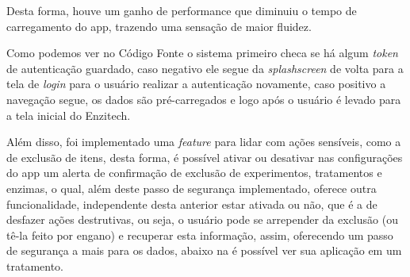 Desta forma, houve um ganho de performance que diminuiu o tempo de carregamento do \ac{app}, trazendo uma sensação de maior fluidez.

Como podemos ver no Código Fonte  o sistema primeiro checa se há algum \textit{token} de autenticação guardado, caso negativo ele segue da \textit{splashscreen} de volta para a tela de \textit{login} para o usuário realizar a autenticação novamente, caso positivo a navegação segue, os dados são pré-carregados e logo após o usuário é levado para a tela inicial do Enzitech.

Além disso, foi implementado uma \textit{feature} para lidar com ações sensíveis, como a de exclusão de itens, desta forma, é possível ativar ou desativar nas configurações do \ac{app} um alerta de confirmação de exclusão de experimentos, tratamentos e enzimas, o qual, além deste passo de segurança implementado, oferece outra funcionalidade, independente desta anterior estar ativada ou não, que é a de desfazer ações destrutivas, ou seja, o usuário pode se arrepender da exclusão (ou tê-la feito por engano) e recuperar esta informação, assim, oferecendo um passo de segurança a mais para os dados, abaixo na  é possível ver sua aplicação em um tratamento.

